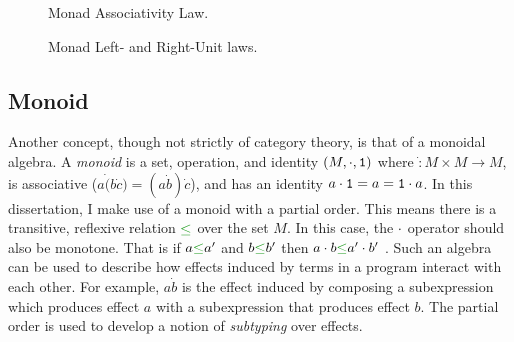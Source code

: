 \begin{figure}
        \centering
        \begin{minipage}{0.45\linewidth}
            \centering
            \begin{framed}
            \end{framed}
            \caption{Monad Associativity Law.}
            \label{MonadAssociativity}
        \end{minipage}\hfill
        \begin{minipage}{0.45\linewidth}
            \centering
            \begin{framed}
                
            \end{framed}
            \caption{Monad Left- and Right-Unit laws.}
            \label{MonadUnits}
        \end{minipage}
\end{figure}


\subsection{Monoid}

Another concept, though not strictly of category theory, is that of a monoidal algebra. A \textit{monoid} is a set, operation, and identity $(M, \dot, \1)$ where $\dot: M\times M \rightarrow M$, is associative ($a\dot(b\dot c) = (a\dot b)\dot c$), and has an identity $a\dot\1 = a = \1\dot a$. In this dissertation, I make use of a monoid with a partial order. This means there is a transitive, reflexive relation $\subeffect$ over the set $M$. In this case, the $\dot$ operator should also be monotone. That is if $a \subeffect a'$ and $b\subeffect b'$ then $a\dot b \subeffect a'\dot b'$ . Such an algebra can be used to describe how effects induced by terms in a program interact with each other. For example, $a \dot b$ is the effect induced by composing a subexpression which produces effect $a$ with a subexpression that produces effect $b$. The partial order is used to develop a notion of \textit{subtyping} over effects.

